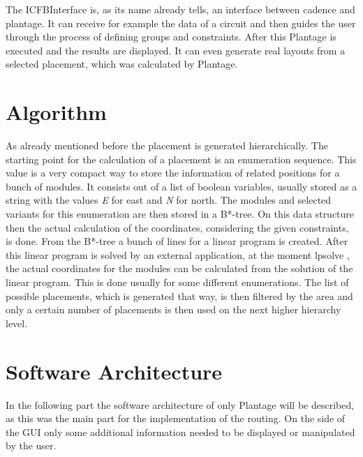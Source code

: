 The ICFBInterface is, as its name already tells, an interface between cadence and plantage. It can receive for example the data of a circuit and then guides the user through the process of defining groups and constraints. After this Plantage is executed and the results are displayed. It can even generate real layouts from a selected placement, which was calculated by Plantage.

\section{Algorithm}
As already mentioned before the placement is generated hierarchically. The starting point for the calculation of a placement is an enumeration sequence. This value is a very compact way to store the information of related positions for a bunch of modules. It consists out of a list of boolean variables, usually stored as a string with the values \textit{E} for east and \textit{N} for north. The modules and selected variants for this enumeration are then stored in a B*-tree. On this data structure then the actual calculation of the coordinates, considering the given constraints, is done. From the B*-tree a bunch of lines for a linear program is created. After this linear program is solved by an external application, at the moment lp\textunderscore solve \cite{lp_solve}, the actual coordinates for the modules can be calculated from the solution of the linear program. This is done usually for some different enumerations. The list of possible placements, which is generated that way, is then filtered by the area and only a certain number of placements is then used on the next higher hierarchy level.

\section{Software Architecture}
In the following part the software architecture of only Plantage will be described, as this was the main part for the implementation of the routing. On the side of the GUI only some additional information needed to be displayed or manipulated by the user.

